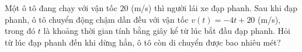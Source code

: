 \begin{ex}%
Một ô tô đang chạy với vận tốc $20$ (m/s) thì người lái xe đạp phanh. Sau khi đạp phanh, ô tô chuyển động chậm dần đều với vận tốc $v(t)=-4t+20$ (m/s), trong đó $t$ là khoảng thời gian tính bằng giây kể từ lúc bắt đầu đạp phanh. Hỏi từ lúc đạp phanh đến khi dừng hẳn, ô tô còn di chuyển được bao nhiêu mét?

\end{ex}

